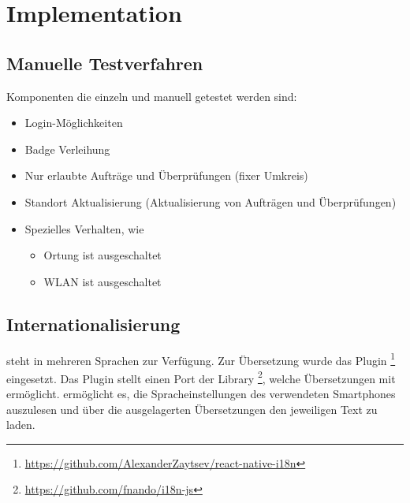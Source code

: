 \chapter{Implementation}
\label{pd-implementation}

\section{Manuelle Testverfahren}
Komponenten die einzeln und manuell getestet werden sind:
\begin{itemize}
	\item Login-Möglichkeiten
	\item Badge Verleihung
	\item Nur erlaubte Aufträge und Überprüfungen (fixer Umkreis)
	\item Standort Aktualisierung (Aktualisierung von Aufträgen und Überprüfungen)
	\item Spezielles Verhalten, wie
	\begin{itemize}
		\item Ortung ist ausgeschaltet
		\item WLAN ist ausgeschaltet
	\end{itemize}
\end{itemize}

\section{Internationalisierung}
\kort{} steht in mehreren Sprachen zur Verfügung.
Zur Übersetzung wurde das Plugin \footnote{\url{https://github.com/AlexanderZaytsev/react-native-i18n}} eingesetzt.
Das Plugin stellt einen  Port der Library \footnote{\url{https://github.com/fnando/i18n-js}}, welche Übersetzungen mit  ermöglicht.\newline
{} ermöglicht es, die Spracheinstellungen des verwendeten Smartphones auszulesen und über die ausgelagerten Übersetzungen den jeweiligen Text zu laden.